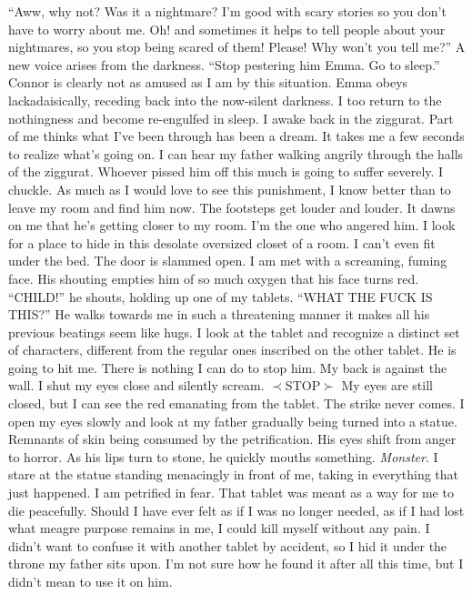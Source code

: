 \documentclass[openany, 12pt]{book}
\newcommand\tab[1][1cm]{\hspace*{#1}}
\begin{document}
\tab
``Aww, why not? Was it a nightmare? I’m good with scary stories so you don’t have to worry about me. Oh! and sometimes it helps to tell people about your nightmares, so you stop being scared of them! Please! Why won’t you tell me?''\newline
\tab
A new voice arises from the darkness. ``Stop pestering him Emma. Go to sleep.'' Connor is clearly not as amused as I am by this situation. Emma obeys lackadaisically, receding back into the now-silent darkness. I too return to the nothingness and become re-engulfed in sleep.\newline
\tab
I awake back in the ziggurat. Part of me thinks what I’ve been through has been a dream. It takes me a few seconds to realize what’s going on. I can hear my father walking angrily through the halls of the ziggurat. Whoever pissed him off this much is going to suffer severely. I chuckle. As much as I would love to see this punishment, I know better than to leave my room and find him now.\newline
\tab
The footsteps get louder and louder. It dawns on me that he’s getting closer to my room. I’m the one who angered him. I look for a place to hide in this desolate oversized closet of a room. I can’t even fit under the bed. The door is slammed open. I am met with a screaming, fuming face. His shouting empties him of so much oxygen that his face turns red.\newline
\tab
``CHILD!'' he shouts, holding up one of my tablets. ``WHAT THE FUCK IS THIS?'' He walks towards me in such a threatening manner it makes all his previous beatings seem like hugs. I look at the tablet and recognize a distinct set of characters, different from the regular ones inscribed on the other tablet. He is going to hit me. There is nothing I can do to stop him. My back is against the wall. I shut my eyes close and silently scream.\newline
$\prec$STOP$\succ$\newline
\tab
My eyes are still closed, but I can see the red emanating from the tablet. The strike never comes. I open my eyes slowly and look at my father gradually being turned into a statue. Remnants of skin being consumed by the petrification. His eyes shift from anger to horror. As his lips turn to stone, he quickly mouths something. \textit{Monster}. I stare at the statue standing menacingly in front of me, taking in everything that just happened. I am petrified in fear.\newline
\tab
That tablet was meant as a way for me to die peacefully. Should I have ever felt as if I was no longer needed, as if I had lost what meagre purpose remains in me, I could kill myself without any pain. I didn’t want to confuse it with another tablet by accident, so I hid it under the throne my father sits upon. I’m not sure how he found it after all this time, but I didn’t mean to use it on him.\newline
\end{document}
